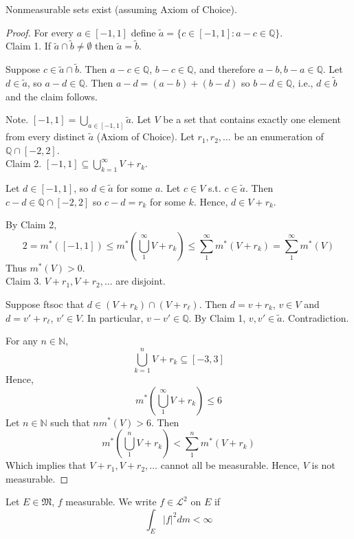 \documentclass[11pt]{article}
\begin{document}
\begin{lemma} Nonmeasurable sets exist (assuming Axiom of Choice).
\end{lemma}
\begin{proof} For every $a \in [-1, 1]$ define $\tilde{a} = \{ c \in [-1, 1] : a - c \in \mathbb{Q} \}$. \\

  Claim 1. If $\tilde{a} \cap \tilde{b} \neq \emptyset$ then $\tilde{a} = \tilde{b}$. 

  Suppose $c \in \tilde{a} \cap \tilde{b}$. Then $a - c \in \mathbb{Q}$, $b - c \in \mathbb{Q}$, and therefore $a - b, b-a \in \mathbb{Q}$. Let $d \in \tilde{a}$, so $a - d \in \mathbb{Q}$. Then $a - d = (a - b) + (b - d)$ so $b -d \in \mathbb{Q}$, i.e., $d \in \tilde{b}$ and the claim follows. 

  Note. $[-1, 1] = \bigcup_{a \in [-1, 1]} \tilde{a}$. 
  Let $V$ be a set that contains exactly one element from every distinct $\tilde{a}$ (Axiom of Choice). Let $r_1, r_2, \dots$ be an enumeration of $\mathbb{Q} \cap [-2, 2]$. \\

  Claim 2. $[-1, 1] \subseteq \bigcup_{k = 1}^\infty V + r_k$. 

  Let $d \in [-1, 1]$, so $d \in \tilde{a}$ for some $a$. Let $c \in V$ s.t. $c \in \tilde{a}$. Then $c - d \in \mathbb{Q} \cap [-2, 2]$ so $c - d = r_k$ for some $k$. Hence, $d \in V + r_k$. 

  By Claim 2, $$2 = m^*([-1, 1]) \le m^* \left( \bigcup_1^\infty V + r_k \right) \le \sum_1^\infty m^*(V + r_k)= \sum_1^\infty m^*(V)$$ Thus $m^*(V) > 0$. \\

  Claim 3. $V+ r_1, V+ r_2, \dots$ are disjoint.

  Suppose ftsoc that $d \in (V + r_k) \cap (V + r_\ell)$. Then $d = v + r_k$, $v \in V$ and $d = v' + r_\ell$, $v' \in V$. In particular, $v - v' \in \mathbb{Q}$. By Claim 1, $v, v' \in \tilde{a}$. Contradiction. 

  For any $n \in \mathbb{N}$, $$\bigcup_{k = 1}^n V + r_k \subseteq [-3, 3]$$Hence, $$m^* \left(\bigcup_1^\infty V + r_k\right) \le 6$$Let $n \in \mathbb{N}$ such that $nm^*(V) > 6$. Then $$m^* \left(\bigcup_1^n V + r_k \right) < \sum_1^n m^*(V + r_k)$$Which implies that $V+r_1, V+r_2, \dots$ cannot all be measurable. Hence, $V$ is not measurable.
\end{proof}

\begin{definition} Let $E \in \mathfrak{M}$, $f$ measurable. We write $f \in \mathscr{L}^2$ on $E$ if $$\int_E |f|^2 dm < \infty$$
\end{definition}
\end{document}
